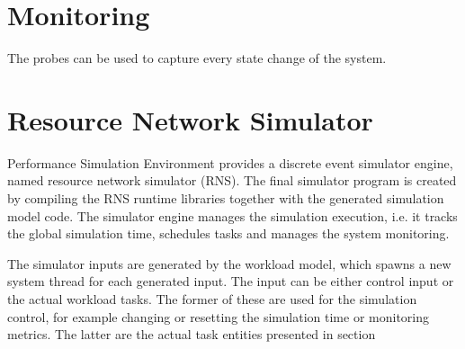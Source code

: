 \section{Monitoring}

The probes can be used to capture every state change of the system.






\section{Resource Network Simulator}
\label{sec:resource-network-simulator}

Performance Simulation Environment provides a discrete event simulator engine, named resource network simulator (RNS). The final simulator program is created by compiling the RNS runtime libraries together with the generated simulation model code. The simulator engine manages the simulation execution, i.e. it tracks the global simulation time, schedules tasks and manages the system monitoring.



The simulator inputs are generated by the workload model, which spawns a new system thread for each generated input. The input can be either control input or the actual workload tasks. The former of these are used for the simulation control, for example changing or resetting the simulation time or monitoring metrics. The latter are the actual task entities presented in section


